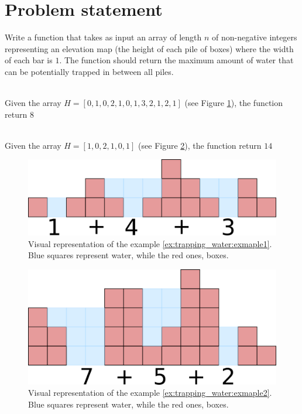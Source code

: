 \section{Problem statement}
\begin{exercise}
Write a function that takes as input an array of length $n$ of non-negative integers representing an elevation map (the height of each pile of boxes) where the width of each bar is $1$. 
The function should return the maximum amount of water that can be potentially trapped in between all piles. 

	\begin{example}
		\label{ex:trapping_water:exmaple1}
		\hfill \\
		Given the array $H=[0,1,0,2,1,0,1,3,2,1,2,1]$ (see Figure \ref{fig:trapping_water_example1}), the function return $8$
	\end{example}

	\begin{example}
		\label{ex:trapping_water:exmaple2}
		\hfill \\
		Given the array $H=[1,0,2,1,0,1]$ (see Figure \ref{fig:trapping_water_example2}), the function return $14$
	\end{example}

\end{exercise}

\begin{figure}
	\centering
	\includegraphics[scale=1.0]{sources/trapping_water/images/example1}
	\caption{Visual representation of the example \ref{ex:trapping_water:exmaple1}. Blue squares represent water, while the red ones, boxes.}
	\label{fig:trapping_water_example1}
\end{figure}



\begin{figure}
	\centering
	\includegraphics[scale=1.0]{sources/trapping_water/images/example2}
	\caption{Visual representation of the example \ref{ex:trapping_water:exmaple2}. Blue squares represent water, while the red ones, boxes.}
	\label{fig:trapping_water_example2}
\end{figure}

